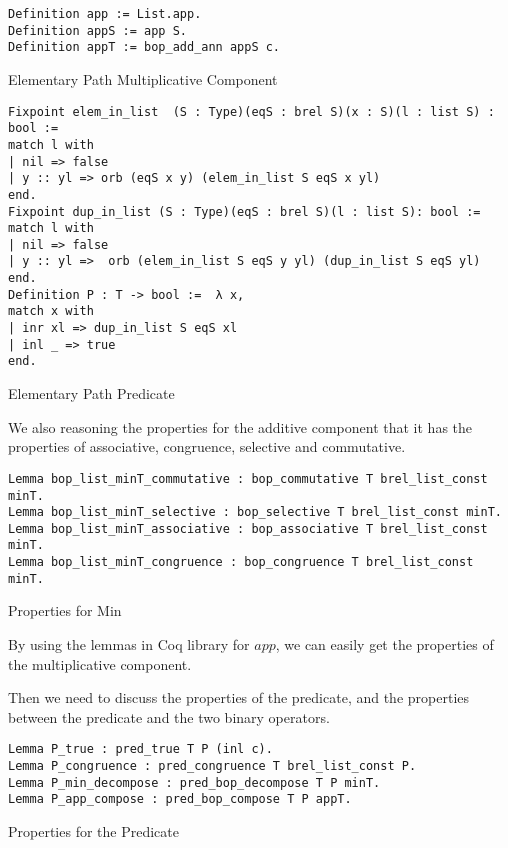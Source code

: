 \begin{listing}[H]
\begin{verbatim}
Definition app := List.app.
Definition appS := app S.
Definition appT := bop_add_ann appS c.
\end{verbatim}
\caption{Elementary Path Multiplicative Component} 
\label{coq:def:elementary_path_app}
\end{listing}

\begin{listing}[H]
\begin{verbatim}
Fixpoint elem_in_list  (S : Type)(eqS : brel S)(x : S)(l : list S) : bool :=
match l with
| nil => false
| y :: yl => orb (eqS x y) (elem_in_list S eqS x yl)
end.
Fixpoint dup_in_list (S : Type)(eqS : brel S)(l : list S): bool :=
match l with
| nil => false
| y :: yl =>  orb (elem_in_list S eqS y yl) (dup_in_list S eqS yl)
end.
Definition P : T -> bool :=  λ x,
match x with
| inr xl => dup_in_list S eqS xl
| inl _ => true
end.
\end{verbatim}
\caption{Elementary Path Predicate} 
\label{coq:def:elementary_path_predicate}
\end{listing}

We also reasoning the properties for the additive component that it has the properties of associative, congruence, selective and commutative.
\begin{listing}[H]
\begin{verbatim}
Lemma bop_list_minT_commutative : bop_commutative T brel_list_const minT.
Lemma bop_list_minT_selective : bop_selective T brel_list_const minT.
Lemma bop_list_minT_associative : bop_associative T brel_list_const minT.
Lemma bop_list_minT_congruence : bop_congruence T brel_list_const minT.
\end{verbatim}
\caption{Properties for Min} 
\label{coq:proof:elementary_path_min}
\end{listing}
By using the lemmas in Coq library for $app$, we can easily get the properties of the multiplicative component.

Then we need to discuss the properties of the predicate, and the properties between the predicate and the two binary operators.
\begin{listing}[H]
\begin{verbatim}
Lemma P_true : pred_true T P (inl c).
Lemma P_congruence : pred_congruence T brel_list_const P.
Lemma P_min_decompose : pred_bop_decompose T P minT.
Lemma P_app_compose : pred_bop_compose T P appT.
\end{verbatim}
\caption{Properties for the Predicate} 
\label{coq:proof:predicate_properties}
\end{listing}


